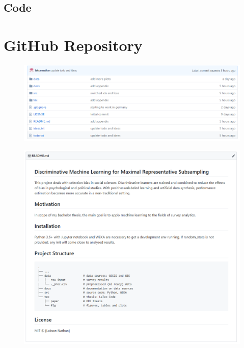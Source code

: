 \begin{appendices}
\section{Code}


\chapter{GitHub Repository}

\begin{figure}[ht]
	\begin{center}
		\includegraphics[scale=0.48,angle=0]{fig/github_a}
		\label{std}
	\end{center}
\end{figure}

\begin{figure}[ht]
	\begin{center}
		\includegraphics[scale=0.48,angle=0]{fig/github_b}
		\label{std}
	\end{center}
\end{figure}


\end{appendices}